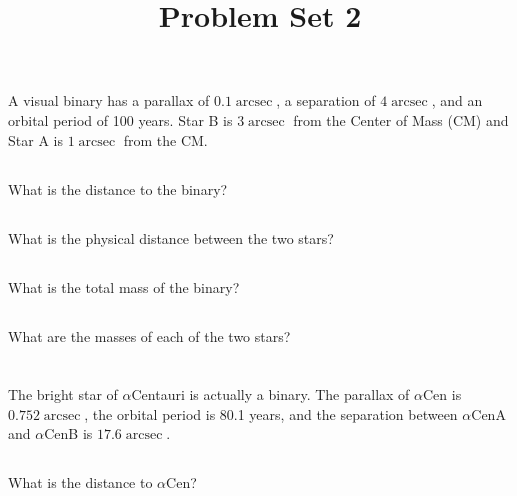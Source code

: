 \documentclass[11pt]{scrartcl}
\title{Problem Set 2}
\DeclareMathOperator{\arcsec}{arcsec}
\begin{document}
\maketitle

\section{}

A visual binary has a parallax of $0.1\arcsec$, a separation of $4 \arcsec$, and an orbital period of 100 years. Star B is $3 \arcsec$ from the Center of Mass (CM) and Star A is $1 \arcsec$ from the CM.

\subsection{}

What is the distance to the binary?

\subsection{}

What is the physical distance between the two stars?

\subsection{}

What is the total mass of the binary?

\subsection{}

What are the masses of each of the two stars?


\section{}

The bright star of $\alpha$Centauri is actually a binary. The parallax of $\alpha$Cen is $0.752\arcsec$, the orbital period is 80.1 years, and the separation between $\alpha$CenA and $\alpha$CenB is $17.6\arcsec$.

\subsection{}

What is the distance to $\alpha$Cen?
\end{document}
